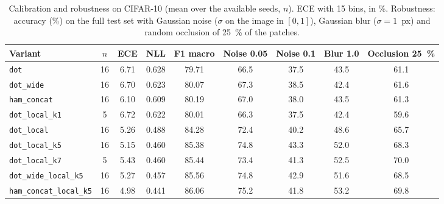 
\begin{table}[!t]
\centering
\footnotesize
\caption{Calibration and robustness on CIFAR-10 (mean over the available seeds, $n$). ECE with 15 bins, in \%. Robustness: accuracy (\%) on the full test set with Gaussian noise ($\sigma$ on the image in $[0,1]$), Gaussian blur ($\sigma=1$~px) and random occlusion of 25~\% of the patches.}
\label{tab:calibracion}
\begin{adjustbox}{max width=\linewidth}
\begin{tabular}{lcccccccc}
\toprule
Variant & $n$ & ECE & NLL & F1 macro & Noise 0.05 & Noise 0.1 & Blur 1.0 & Occlusion 25~\% \\
\midrule
\texttt{dot} & 16 & 6.71 & 0.628 & 79.71 & 66.5 & 37.5 & 43.5 & 61.1 \\
\texttt{dot\_wide} & 16 & 6.70 & 0.623 & 80.07 & 67.3 & 38.5 & 42.4 & 61.6 \\
\texttt{ham\_concat} & 16 & 6.10 & 0.609 & 80.19 & 67.0 & 38.0 & 43.5 & 61.3 \\
\texttt{dot\_local\_k1} & 5 & 6.72 & 0.622 & 80.01 & 66.3 & 37.5 & 42.4 & 59.6 \\
\texttt{dot\_local} & 16 & 5.26 & 0.488 & 84.28 & 72.4 & 40.2 & 48.6 & 65.7 \\
\texttt{dot\_local\_k5} & 16 & 5.15 & 0.460 & 85.38 & 74.8 & 43.3 & 52.0 & 68.3 \\
\texttt{dot\_local\_k7} & 5 & 5.43 & 0.460 & 85.44 & 73.4 & 41.3 & 52.5 & 70.0 \\
\texttt{dot\_wide\_local\_k5} & 16 & 5.27 & 0.457 & 85.56 & 74.8 & 42.9 & 51.6 & 68.5 \\
\texttt{ham\_concat\_local\_k5} & 16 & 4.98 & 0.441 & 86.06 & 75.2 & 41.8 & 53.2 & 69.8 \\
\bottomrule
\end{tabular}
\end{adjustbox}
\end{table}
